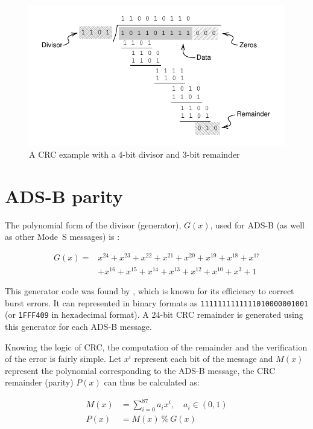 \begin{figure}[ht]
  \includegraphics[scale=0.9]{figures/crc/crc_example.pdf}
  \caption{A CRC example with a 4-bit divisor and 3-bit remainder}
  \label{fig:crc_example}
\end{figure}



\section{ADS-B parity}

The polynomial form of the divisor (generator), $G(x)$, used for ADS-B (as well as other Mode~S messages) is \cite{gertz1984}:

\begin{equation}
  \begin{split}
  G(x) = &x^{24}+x^{23}+x^{22}+x^{21}+x^{20}+x^{19}+x^{18}+x^{17} \\
         &+x^{16}+x^{15}+x^{14}+x^{13}+x^{12}+x^{10}+x^{3}+1
  \end{split}
\end{equation}

This generator code was found by \cite{kasami1964}, which is known for its efficiency to correct burst errors. It can represented in binary formats as \texttt{1111111111111010000001001} (or \texttt{1FFF409} in hexadecimal format). A 24-bit CRC remainder is generated using this generator for each ADS-B message.

Knowing the logic of CRC, the computation of the remainder and the verification of the error is fairly simple. Let  $x^{i}$ represent each bit of the message and $M(x)$ represent the polynomial corresponding to the ADS-B message, the CRC remainder (parity) $P(x)$ can thus be calculated as:

\begin{equation}
  \begin{split}
    M(x) &= \sum_{i=0}^{87} a_i x^i , \quad a_i \in (0, 1)\\
    P(x) &= M(x) ~ \% ~ G(x)
  \end{split}
\end{equation}

